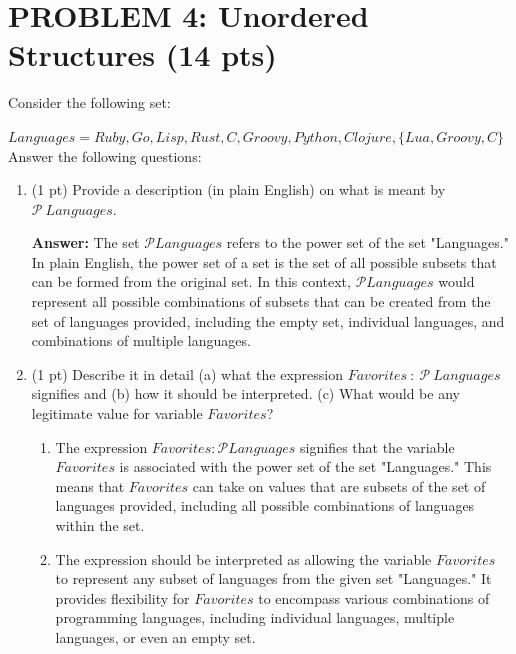 \documentclass[12pt]{article}
\begin{document}
\begin{spacing}{1.5}
\begin{enumerate}
\begin{center}
		      \end{center}
		      		      		      		      		        
	\end{enumerate}	    
	\newpage
	\section*{PROBLEM 4: Unordered Structures (14 pts)}
					
	Consider the following set:
				
	$Languages=Ruby, Go, Lisp, Rust, C, Groovy, Python, Clojure, \{Lua, Groovy, C\}$\\
				
	Answer the following questions:
				
	\begin{enumerate}
		\item (1 pt) Provide a description (in plain English) on what is meant by $\mathcal{P} \: Languages$.
		      		      		      		      
		      \textbf{Answer:} The set $\mathcal{P} Languages$ refers to the power set of the set "Languages." In plain English, the power set of a set is the set of all possible subsets that can be formed from the original set. In this context, $\mathcal{P} Languages$ would represent all possible combinations of subsets that can be created from the set of languages provided, including the empty set, individual languages, and combinations of multiple languages.\\
		      		      		      		      
		\item (1 pt) Describe it in detail (a) what the expression $Favorites\: : \: \mathcal{P} \: Languages$ signifies and (b) how it should be interpreted. (c) What would be any legitimate value for variable $Favorites$?
		      		      		      		      
		      \begin{enumerate}
		      	\item The expression $Favorites : \mathcal{P} Languages$ signifies that the variable $Favorites$ is associated with the power set of the set "Languages." This means that $Favorites$ can take on values that are subsets of the set of languages provided, including all possible combinations of languages within the set. 

		      	\item The expression should be interpreted as allowing the variable $Favorites$ to represent any subset of languages from the given set "Languages." It provides flexibility for $Favorites$ to encompass various combinations of programming languages, including individual languages, multiple languages, or even an empty set. 


\end{enumerate}
\end{enumerate}
\end{spacing}
\end{document}
